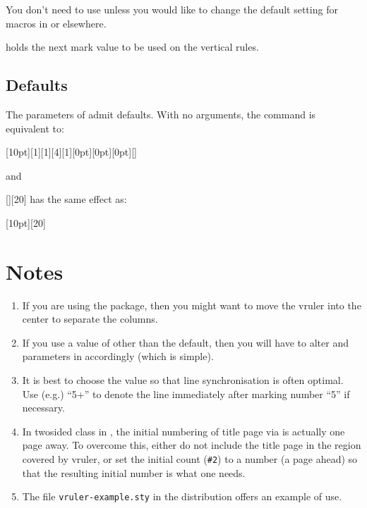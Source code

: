 \documentclass[a4paper]{article}
\newcommand\nl{\par\noindent}
\begin{document}
You don't need to use  unless you would like to change
the default setting for macros in  or elsewhere.
\par\addvspace{1ex}
\noindent{} holds the next mark value to be used on the
vertical rules.

\subsection*{Defaults}

The parameters of  admit defaults.  With no arguments,
the command is equivalent to:\nl
\leavevmode\quad{}[10pt][1][1][4][1][0pt][0pt][0pt][]\nl
and\nl
\leavevmode\quad{}[][20] has the same effect as:\nl
\leavevmode\quad{}[10pt][20]

\section{Notes}

\begin{enumerate}
\item If you are using the  package, then you might
  want to move the vruler into the center to separate the columns.
\item If you use a value of  other than the default, then
  you will have to alter  and  parameters in
   accordingly (which is simple).
\item It is best to choose the value   so
  that line synchronisation is often optimal.  Use (e.g.\@) ``5+'' to
  denote the line immediately after marking number ``5'' if
  necessary.
\item In twosided  class in \LaTeXe{}, the initial
  numbering of title page via  is actually
  one page away.  To overcome this, either do not include the title
  page in the region covered by vruler, or set the initial count
  (\texttt{\#2}) to a number (a page ahead) so that the resulting
  initial number is what one needs.
\item The file \texttt{vruler-example.sty} in the distribution offers
  an example of use.
\end{enumerate}
\end{document}
